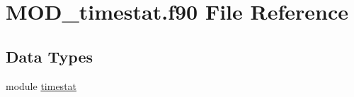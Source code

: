 \hypertarget{MOD__timestat_8f90}{\section{M\-O\-D\-\_\-timestat.\-f90 File Reference}
\label{MOD__timestat_8f90}
}
\subsection*{Data Types}
\begin{DoxyCompactItemize}
\item 
module \hyperlink{classtimestat}{timestat}
\end{DoxyCompactItemize}
